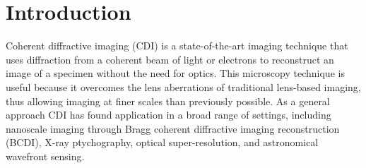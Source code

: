 \documentclass[sn-mathphys]{sn-jnl}%
\theoremstyle{thmstyleone}%
\theoremstyle{thmstyletwo}%
\theoremstyle{thmstylethree}%
\begin{document}









\maketitle


\section{Introduction }\label{sec1}
Coherent diffractive imaging (CDI) is a state-of-the-art imaging technique that uses diffraction from a coherent beam of light or electrons to reconstruct an image of a specimen without the need for optics. This microscopy technique is useful because it overcomes the lens aberrations of traditional lens-based imaging, thus allowing imaging at finer scales than previously possible. As a general approach CDI has found application in a broad range of settings, including nanoscale imaging through Bragg coherent diffractive imaging reconstruction (BCDI), X-ray ptychography, optical super-resolution, and astronomical wavefront sensing. \cite{dean2006phase, heintzmann2021answers, miao2015beyond}
\end{document}
